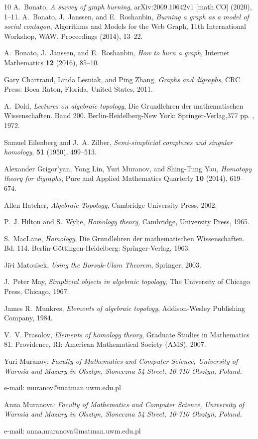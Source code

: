 \documentclass[a4paper, 11pt]{article}
\begin{document}

\begin{thebibliography}{10}
A.~Bonato, \emph{A survey of graph burning}, arXiv:2009.10642v1 [math.CO]
  (2020), 1--11.
A.~Bonato, J.~Janssen, and E.~Roshanbin, \emph{Burning a graph as a model of
  social contagon}, Algorithms and Models for the Web Graph, 11th International
  Workshop, WAW, Proceedings (2014), 13--22.

A.~Bonato, J.~Janssen, and E.~Roshanbin, \emph{How to burn a graph}, Internet Mathematics \textbf{12} (2016),
  85--10.

Gary Chartrand, Linda Lesniak, and Ping Zhang, \emph{Graphs and digraphs}, CRC
  Press: Boca Raton, Florida, United States, 2011.

A.~Dold, \emph{{Lectures on algebraic topology}}, {Die Grundlehren der
  mathematischen Wissenschaften. Band 200. Berlin-Heidelberg-New York:
  Springer-Verlag,377 pp. }, 1972.

Samuel Eilenberg and J.~A. Zilber, \emph{Semi-simplicial complexes and singular
  homology},  \textbf{51} (1950), 499--513.

Alexander Grigor'yan, Yong Lin, Yuri Muranov, and Shing-Tung Yau,
  \emph{Homotopy theory for digraphs}, Pure and Applied Mathematics Quarterly
  \textbf{10} (2014), 619--674.

Allen Hatcher, \emph{Algebraic {T}opology}, Cambridge University Press, 2002.

P.~J. Hilton and S.~Wylie, \emph{Homology theory}, Cambridge, University Press,
  1965.

S.~MacLane, \emph{Homology}, Die Grundlehren der mathematischen Wissenschaften.
  Bd. 114. Berlin-G{\"o}ttingen-Heidelberg: Springer-Verlag, 1963.

Ji$\breve{r}$i Matou$\breve{s}$ek, \emph{Using the {B}orsuk-{U}lam {T}heorem},
  Springer, 2003.

J.~Peter May, \emph{Simplicial objects in algebraic topology}, The University
  of Chicago Press, Chicago, 1967.

James R.~Munkres, \emph{Elements of algebraic topology}, Addison-Wesley
  Publishing Company, 1984.

V.~V. Prasolov, \emph{Elements of homology theory}, Graduate Studies in
  Mathematics 81. Providence, RI: American Mathematical Society (AMS), 2007.

\end{thebibliography}




Yuri Muranov: \emph{Faculty of Mathematics and Computer Science, University
of Warmia and Mazury in Olsztyn, Sloneczna 54 Street, 10-710 Olsztyn, Poland. }

e-mail: muranov@matman.uwm.edu.pl


\smallskip


Anna Muranova: \emph{Faculty of Mathematics and Computer Science, University
of Warmia and Mazury in Olsztyn, Sloneczna 54 Street, 10-710 Olsztyn, Poland. }

e-mail: anna.muranova@matman.uwm.edu.pl
\end{document}
